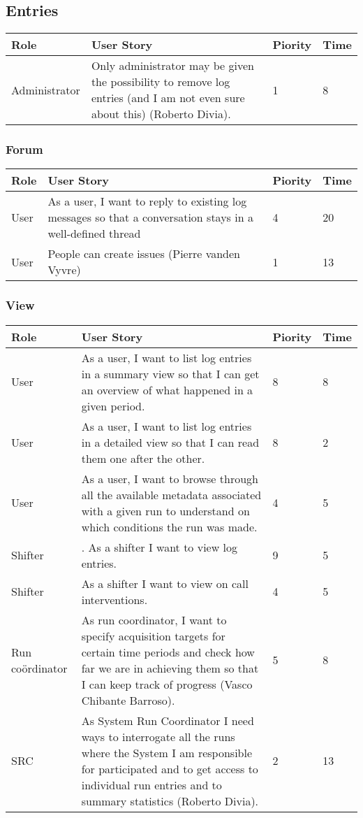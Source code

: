
\subsection{Entries}
\begin{longtable}{ | p{2cm} | p{8cm} | p{1.5cm} | l |}
\hline
Role & User Story & Piority & Time \\ \hline
Administrator &  Only administrator may be given the possibility to remove log entries
(and I am not even sure about this) (Roberto Divia). & 1 & 8 \\ \hline
\end{longtable}

\subsubsection{Forum}
\begin{longtable}{ | p{2cm} | p{8cm} | p{1.5cm} | l |}
\hline
Role & User Story & Piority & Time \\ \hline
User &  As a user, I want to reply to existing log messages so that a conversation stays in a well-defined thread & 4 & 20 \\ \hline
User &  People can create issues (Pierre vanden Vyvre) & 1 & 13 \\ \hline


\end{longtable}

\subsubsection{View}
\begin{longtable}{ | p{2cm} | p{8cm} | p{1.5cm} | l |}
\hline
Role & User Story & Piority & Time \\ \hline
User &  As a user, I want to list log entries in a summary view so that I can
get an overview of what happened in a given period. & 8 & 8 \\ \hline
User &  As a user, I want to list log entries in a detailed view so that I can read them one after the other. & 8 & 2 \\ \hline
User &  As a user, I want to browse through all the available metadata associated with a given run to understand on which conditions the run was made. & 4 & 5 \\ \hline
Shifter & . As a shifter I want to view log entries. & 9 & 5 \\ \hline
Shifter &  As a shifter I want to view on call interventions. & 4 & 5 \\ \hline
Run coördinator &  As run coordinator, I want to specify acquisition targets for certain
time periods and check how far we are in achieving them so that I can
keep track of progress (Vasco Chibante Barroso). & 5 & 8 \\ \hline
SRC &  As System Run Coordinator I need ways to interrogate all the runs where the System I am responsible for participated and to get access to individual run entries and to summary statistics (Roberto Divia). & 2 & 13 \\ \hline
\end{longtable}

